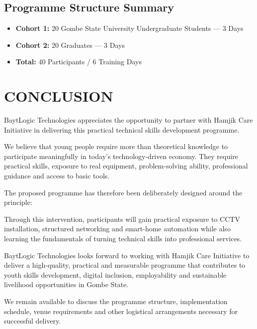 \documentclass[11pt,a4paper]{article}
\begin{document}
\subsection{Programme Structure Summary}
\begin{itemize}
    \item \textbf{Cohort 1:} 20 Gombe State University Undergraduate Students — 3 Days
    \item \textbf{Cohort 2:} 20 Graduates — 3 Days
    \item \textbf{Total:} 40 Participants / 6 Training Days
\end{itemize}

\section{CONCLUSION}
BaytLogic Technologies appreciates the opportunity to partner with Hamjik Care Initiative in delivering this practical technical skills development programme.

We believe that young people require more than theoretical knowledge to participate meaningfully in today's technology-driven economy. They require practical skills, exposure to real equipment, problem-solving ability, professional guidance and access to basic tools.

The proposed programme has therefore been deliberately designed around the principle:
\begin{center}
\end{center}

Through this intervention, participants will gain practical exposure to CCTV installation, structured networking and smart-home automation while also learning the fundamentals of turning technical skills into professional services.

BaytLogic Technologies looks forward to working with Hamjik Care Initiative to deliver a high-quality, practical and measurable programme that contributes to youth skills development, digital inclusion, employability and sustainable livelihood opportunities in Gombe State.

We remain available to discuss the programme structure, implementation schedule, venue requirements and other logistical arrangements necessary for successful delivery.
\end{document}
